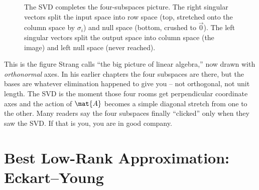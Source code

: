 \begin{figure}[H]
\centering
{}
\caption{The SVD completes the four-subspaces picture. The right singular vectors
split the input space into row space (top, stretched onto the column space
by $\sigma_i$) and null space (bottom, crushed to $\vec{0}$). The left singular vectors
split the output space into column space (the image) and left null space (never
reached).}
\label{ch29:fig-four-subspaces}
\end{figure}

\begin{strangbox}
This is the figure Strang calls ``the big picture of linear algebra,'' now drawn
with \emph{orthonormal} axes. In his earlier chapters the four subspaces are
there, but the bases are whatever elimination happened to give you -- not
orthogonal, not unit length. The SVD is the moment those four rooms get
perpendicular coordinate axes and the action of $\mat{A}$ becomes a simple
diagonal stretch from one to the other. Many readers say the four subspaces
finally ``clicked'' only when they saw the SVD. If that is you, you are in good
company.
\end{strangbox}

\section{Best Low-Rank Approximation: Eckart--Young}
\label{ch29:eckart-young}

